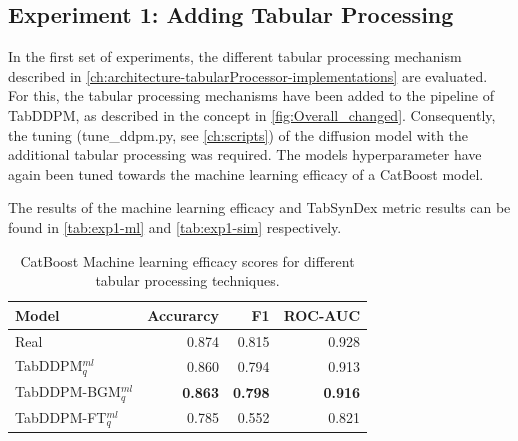 \subsection{Experiment 1: Adding Tabular Processing}
\label{ch:Experiment-1}

In the first set of experiments, the different tabular processing mechanism described in \autoref{ch:architecture-tabularProcessor-implementations} are evaluated.
For this, the tabular processing mechanisms have been added to the pipeline of TabDDPM, as described in the concept in \autoref{fig:Overall_changed}.
Consequently, the tuning (tune\_ddpm.py, see \autoref{ch:scripts}) of the diffusion model with the additional tabular processing was required.
The models hyperparameter have again been tuned towards the machine learning efficacy of a CatBoost model.

The results of the machine learning efficacy and TabSynDex metric results can be found in \autoref{tab:exp1-ml} and \autoref{tab:exp1-sim} respectively.
\begin{table}[h]
	\centering
	\begin{tabular}{lrrr}
		\toprule
		\textbf{Model}         & \textbf{Accurarcy} & \textbf{F1}    & \textbf{ROC-AUC} \\
		\midrule
		Real                   & 0.874              & 0.815          & 0.928            \\
		TabDDPM$^{ml}_{q}$     & 0.860              & 0.794          & 0.913            \\
		TabDDPM-BGM$^{ml}_{q}$ & \textbf{0.863}     & \textbf{0.798} & \textbf{0.916}   \\
		TabDDPM-FT$^{ml}_{q}$  & 0.785              & 0.552          & 0.821            \\
		\bottomrule
	\end{tabular}
	\caption[Experiment1-ML-Efficacy]{CatBoost Machine learning efficacy scores for different tabular processing techniques.}
	\label{tab:exp1-ml}
\end{table}

